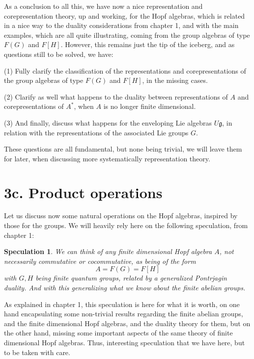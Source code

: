 \documentclass[12pt]{amsbook}
\newtheorem{speculation}[theorem]{Speculation}
\begin{document}
As a conclusion to all this, we have now a nice representation and corepresentation theory, up and working, for the Hopf algebras, which is related in a nice way to the duality considerations from chapter 1, and with the main examples, which are all quite illustrating, coming from the group algebras of type $F(G)$ and $F[H]$. However, this remains just the tip of the iceberg, and as questions still to be solved, we have:

\bigskip

(1) Fully clarify the classification of the representations and corepresentations of the  group algebras of type $F(G)$ and $F[H]$, in the missing cases.

\bigskip

(2) Clarify as well what happens to the duality between representations of $A$ and corepresentations of $A^*$, when $A$ is no longer finite dimensional.

\bigskip

(3) And finally, discuss what happens for the enveloping Lie algebras $U\mathfrak g$, in relation with the representations of the associated Lie groups $G$.

\bigskip

These questions are all fundamental, but none being trivial, we will leave them for later, when discussing more systematically representation theory. 

\section*{3c. Product operations}

Let us discuss now some natural operations on the Hopf algebras, inspired by those for the groups. We will heavily rely here on the following speculation, from chapter 1:

\begin{speculation}
We can think of any finite dimensional Hopf algebra $A$, not necessarily commutative or cocommutative, as being of the form
$$A=F(G)=F[H]$$
with $G,H$ being finite quantum groups, related by a generalized Pontrjagin duality. And with this generalizing what we know about the finite abelian groups.
\end{speculation}

As explained in chapter 1, this speculation is here for what it is worth, on one hand encapsulating some non-trivial results regarding the finite abelian groups, and the finite dimensional Hopf algebras, and the duality theory for them, but on the other hand, missing some important aspects of the same theory of finite dimensional Hopf algebras. Thus, interesting speculation that we have here, but to be taken with care.
\end{document}
